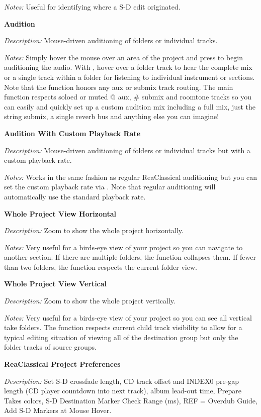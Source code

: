 \documentclass[10pt,american]{article}
\begin{document}
\emph{Notes: }Useful for identifying where a S-D edit originated.

\textbf{Audition }

\emph{Description:} Mouse-driven auditioning of folders or individual tracks.

\emph{Notes: }Simply hover the mouse over an area of the project and press
 to begin auditioning the audio. With , hover over a folder
track to hear the complete mix or a single track within a folder for listening
to individual instrument or sections. Note that the  function honors any
aux or submix track routing. The main function respects soloed or muted @ aux,
\# submix and roomtone tracks so you can easily and quickly set up a custom
audition mix including a full mix, just the string submix, a single reverb bus
and anything else you can imagine!

\textbf{Audition With Custom Playback Rate }

\emph{Description:} Mouse-driven auditioning of folders or individual tracks but
with a custom playback rate.

\emph{Notes: }Works in the same fashion as regular ReaClassical auditioning but
you can set the custom playback rate via . Note that regular
auditioning will automatically use the standard playback rate.

\textbf{Whole Project View Horizontal }

\emph{Description: }Zoom to show the whole project horizontally. 

\emph{Notes: }Very useful for a birds-eye view of your project so you can
navigate to another section. If there are multiple folders, the function
collapses them. If fewer than two folders, the function respects the current
folder view.

\textbf{Whole Project View Vertical }

\emph{Description: }Zoom to show the whole project vertically. 

\emph{Notes: }Very useful for a birds-eye view of your project so you can see
all vertical take folders. The function respects current child track visibility
to allow for a typical editing situation of viewing all of the destination group
but only the folder tracks of source groups.

\textbf{ReaClassical Project Preferences }

\emph{Description: }Set S-D crossfade length, CD track offset and INDEX0 pre-gap
length (CD player countdown into next track), album lead-out time, Prepare Takes
colors, S-D Destination Marker Check Range (ms), REF = Overdub Guide, Add S-D
Markers at Mouse Hover.
\end{document}
